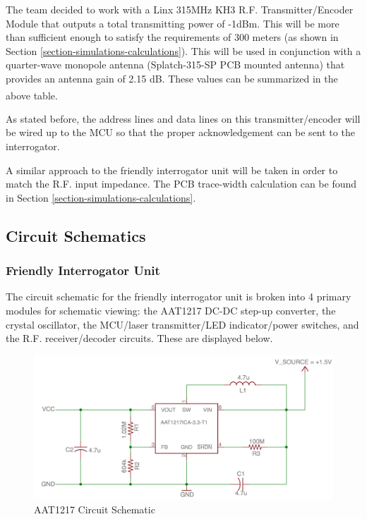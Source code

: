 \documentclass[letterpaper,10pt]{article}
\begin{document}
\begin{spacing}{1.15}
The team decided to work with a Linx 315MHz KH3 R.F. Transmitter/Encoder Module that outputs a total transmitting power of -1dBm. This will be more than sufficient enough to satisfy the requirements of 300 meters (as shown in Section \ref{section-simulations-calculations}). This will be used in conjunction with a quarter-wave monopole antenna (Splatch-315-SP PCB mounted antenna) that provides an antenna gain of 2.15 dB. These values can be summarized in the above table\textsuperscript{\cite{Linx-Transmitter}\cite{Linx-Antenna}}.

As stated before, the address lines and data lines on this transmitter/encoder will be wired up to the MCU so that the proper acknowledgement can be sent to the interrogator.

A similar approach to the friendly interrogator unit will be taken in order to match the R.F. input impedance. The PCB trace-width calculation can be found in Section \ref{section-simulations-calculations}.



\subsection{Circuit Schematics} \label{section-circuit-schematics}

\subsubsection{Friendly Interrogator Unit}
The circuit schematic for the friendly interrogator unit is broken into 4 primary modules for schematic viewing: the AAT1217 DC-DC step-up converter, the crystal oscillator, the MCU/laser transmitter/LED indicator/power switches, and the R.F. receiver/decoder circuits. These are displayed below.
\begin{figure} [H]
	\centering
	\includegraphics[scale=0.35]{Voltage_Converter_Schematic.png}
	\caption{AAT1217 Circuit Schematic\label{fig:voltage-converter-schematic}}
\end{figure}


\end{spacing}
\end{document}
